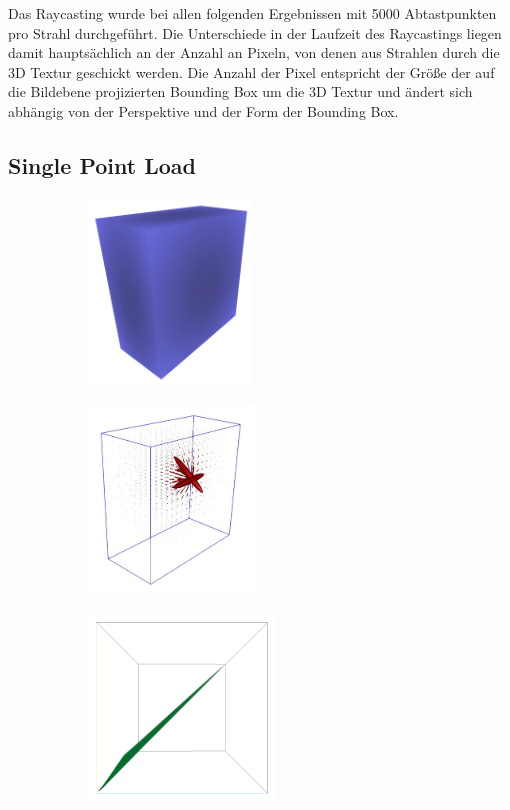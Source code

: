 \documentclass[a4paper,fontsize=12pt,toc=bib,parskip=half,ngerman]{scrartcl}
\begin{document}
Das Raycasting wurde bei allen folgenden Ergebnissen mit 5000 Abtastpunkten pro Strahl durchgef\"uhrt. Die Unterschiede in der Laufzeit des Raycastings liegen damit haupts\"achlich an der Anzahl an Pixeln, von denen aus Strahlen durch die 3D Textur geschickt werden. Die Anzahl der Pixel entspricht der Gr\"o{\ss}e der auf die Bildebene projizierten Bounding Box um die 3D Textur und \"andert sich abh\"angig von der Perspektive und der Form der Bounding Box.


\subsection{Single Point Load}

\begin{figure}
		\begin{subfigure}{0.28\textwidth}
		\centering
		\includegraphics[height=5cm]{pictures/results/SinglePoint/SinglePoint_Object.png}
		\subcaption{}
		\label{SinglePointObject}
	\end{subfigure}
	\hspace*{\fill}
	\begin{subfigure}{0.28\textwidth}
		\centering
		\includegraphics[height=5cm]{pictures/results/SinglePoint/SinglePoint_Ellipsoids.png}
		\subcaption{}
		\label{SinglePointEllipsoids}
	\end{subfigure}
	\hspace*{\fill}
	\begin{subfigure}{0.34\textwidth}
		\centering
		\includegraphics[height=5cm]{pictures/results/SinglePoint/SinglePoint_InvariantSpace.png}

\end{subfigure}
\end{figure}
\end{document}
